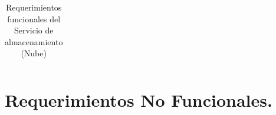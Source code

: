\begin{table}[htb]
\begin{tabular}{| p{2cm} |  p{13.5cm} |}
\end{tabular}
\caption{Requerimientos funcionales del Servicio de almacenamiento (Nube)}
\label{Servicio de almacenamiento (Nube) }
\end{table}


\section{Requerimientos No Funcionales. }
